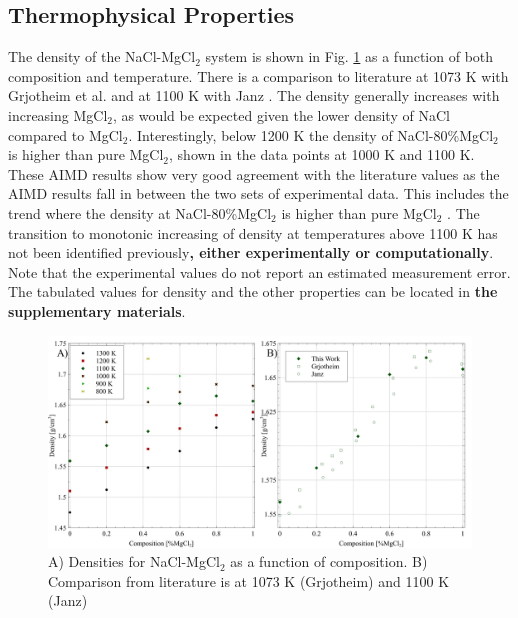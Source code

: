\documentclass[review]{elsarticle}
\providecommand{\DIFaddtex}[1]{{\bf #1}} %
\providecommand{\DIFdeltex}[1]{} %
\providecommand{\DIFaddbegin}{\protect\color{blue}} %
\providecommand{\DIFaddend}{\protect\color{black}} %
\providecommand{\DIFdelbegin}{\protect\color{red}} %
\providecommand{\DIFdelend}{\protect\color{black}} %
\providecommand{\DIFadd}[1]{\texorpdfstring{\DIFaddtex{#1}}{#1}} %
\providecommand{\DIFdel}[1]{\texorpdfstring{\DIFdeltex{#1}}{}} %
\newcommand{\DIFscaledelfig}{0.5}
\newlength{\DIFdelgraphicswidth} %
\newlength{\DIFdelgraphicsheight} %
\newcommand{\DIFaddincludegraphics}[2][]{{\color{blue}\fbox{\DIFOincludegraphics[#1]{#2}}}} %
\newcommand{\DIFdelincludegraphics}[2][]{%
\sbox{\DIFdelgraphicsbox}{\DIFOincludegraphics[#1]{#2}}%
\settoboxwidth{\DIFdelgraphicswidth}{\DIFdelgraphicsbox} %
\settoboxtotalheight{\DIFdelgraphicsheight}{\DIFdelgraphicsbox} %
\scalebox{\DIFscaledelfig}{%
\parbox[b]{\DIFdelgraphicswidth}{\usebox{\DIFdelgraphicsbox}\\[-\baselineskip] \rule{\DIFdelgraphicswidth}{0em}}\llap{\resizebox{\DIFdelgraphicswidth}{\DIFdelgraphicsheight}{%
\setlength{\unitlength}{\DIFdelgraphicswidth}%
\begin{picture}(1,1)%
\thicklines\linethickness{2pt} %
{\color[rgb]{1,0,0}\put(0,0){\framebox(1,1){}}}%
{\color[rgb]{1,0,0}\put(0,0){\line( 1,1){1}}}%
{\color[rgb]{1,0,0}\put(0,1){\line(1,-1){1}}}%
\end{picture}%
}\hspace*{3pt}}} %
} %
\DeclareRobustCommand{\DIFaddbegin}{\DIFOaddbegin \let\includegraphics\DIFaddincludegraphics} %
\DeclareRobustCommand{\DIFaddend}{\DIFOaddend \let\includegraphics\DIFOincludegraphics} %
\DeclareRobustCommand{\DIFdelbegin}{\DIFOdelbegin \let\includegraphics\DIFdelincludegraphics} %
\DeclareRobustCommand{\DIFdelend}{\DIFOaddend \let\includegraphics\DIFOincludegraphics} %
\begin{document}
\DIFaddend \subsection{Thermophysical Properties}
The density of the NaCl-MgCl$_2$ system is shown in Fig. \ref{fig:density} as a function of both composition and temperature. There is a comparison to literature at 1073 K with Grjotheim et al. \cite{grjotheim1971} and at 1100 K with Janz \cite{Janz1988}. The density generally increases with increasing MgCl$_2$, as would be expected given the lower density of NaCl compared to MgCl$_2$. Interestingly, below 1200 K the density of NaCl-80\%MgCl$_2$ is higher than pure MgCl$_2$, shown in the data points at 1000 K and 1100 K. These AIMD results show very good agreement with the literature values as the AIMD results fall in between the two sets of experimental data. This includes the trend where the density at NaCl-80\%MgCl$_2$ is higher than pure MgCl$_2$ \cite{grjotheim1971}. The transition to monotonic increasing of density at temperatures above 1100 K has not been identified previously\DIFaddbegin \DIFadd{, either experimentally or computationally}\DIFaddend . Note that the experimental values do not report an estimated measurement error. The tabulated values for density and the other properties can be located in \DIFdelbegin \DIFdel{Appendix A}\DIFdelend \DIFaddbegin \DIFadd{the supplementary materials}\DIFaddend .
\begin{figure}[h]
 \centering
 \includegraphics[width=1.0\textwidth]{images/density_combined_figures.jpg} 
 \caption{A) Densities for NaCl-MgCl$_2$ as a function of composition. B) Comparison from literature is at 1073 K (Grjotheim) \cite{grjotheim1971} and 1100 K (Janz) \cite{Janz1988}}
 \label{fig:density}
\end{figure} 
\end{document}
